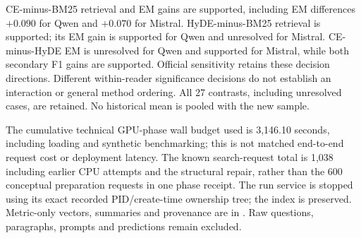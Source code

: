 

CE-minus-BM25 retrieval and EM gains are supported, including EM differences $+0.090$ for Qwen and $+0.070$ for Mistral. HyDE-minus-BM25 retrieval is supported; its EM gain is supported for Qwen and unresolved for Mistral. CE-minus-HyDE EM is unresolved for Qwen and supported for Mistral, while both secondary F1 gains are supported. Official sensitivity retains these decision directions. Different within-reader significance decisions do not establish an interaction or general method ordering. All 27 contrasts, including unresolved cases, are retained. No historical mean is pooled with the new sample.

The cumulative technical GPU-phase wall budget used is 3,146.10 seconds, including loading and synthetic benchmarking; this is not matched end-to-end request cost or deployment latency. The known search-request total is 1,038 including earlier CPU attempts and the structural repair, rather than the 600 conceptual preparation requests in one phase receipt. The run service is stopped using its exact recorded PID/create-time ownership tree; the index is preserved. Metric-only vectors, summaries and provenance are in . Raw questions, paragraphs, prompts and predictions remain excluded.

